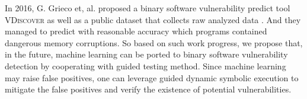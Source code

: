 In 2016, G. Grieco et, al. proposed a binary software vulnerability predict tool \textsc{VDiscover} as well as a public dataset that collects raw analyzed data \cite{Grieco:2016:TLV}. 
 And they managed to predict with reasonable accuracy which programs contained dangerous memory corruptions.
 So based on such work progress, we propose that, in the future, machine learning can be ported to binary software vulnerability detection by cooperating with guided testing method. Since machine learning may raise false positives, one can leverage guided dynamic symbolic execution to mitigate the false positives and verify the existence of potential vulnerabilities.